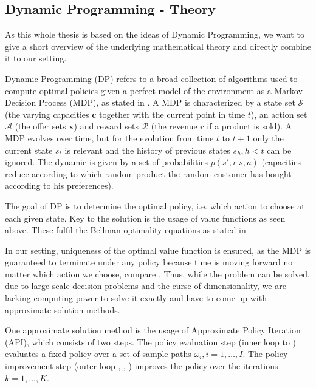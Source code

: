 \subsection{Dynamic Programming - Theory}

As this whole thesis is based on the ideas of Dynamic Programming, we want to give a short overview of the underlying mathematical theory and directly combine it to our setting.

Dynamic Programming (DP) refers to a broad collection of algorithms used to compute optimal policies given a perfect model of the environment as a Markov Decision Process (MDP), as stated in \cite{Sutton.2018}. A MDP is characterized by a state set $\mathcal{S}$ (the varying capacities $\boldsymbol{c}$ together with the current point in time $t$), an action set $\mathcal{A}$ (the offer sets $\boldsymbol{x}$) and reward sets $\mathcal{R}$ (the revenue $r$ if a product is sold). A MDP evolves over time, but for the evolution from time $t$ to $t+1$ only the current state $s_t$ is relevant and the history of previous states $s_h, h<t$ can be ignored. The dynamic is given by a set of probabilities $p(s', r | s, a)$ (capacities reduce according to which random product the random customer has bought according to his preferences). 

The goal of DP is to determine the optimal policy, i.e. which action to choose at each given state. Key to the solution is the usage of value functions as seen above. These fulfil the Bellman optimality equations as stated in . 

In our setting, uniqueness of the optimal value function is ensured, as the MDP is guaranteed to terminate under any policy because time is moving forward no matter which action we choose, compare \cite{Sutton.2018}. Thus, while the problem can be solved, due to large scale decision problems and the curse of dimensionality, we are lacking computing power to solve it exactly and have to come up with approximate solution methods.

One approximate solution method is the usage of Approximate Policy Iteration (API), which consists of two steps. The policy evaluation step (inner loop  to ) evaluates a fixed policy over a set of sample paths $\omega_i, i = 1, \dots, I$. The policy improvement step (outer loop , , ) improves the policy over the iterations $k = 1, \dots, K$.




